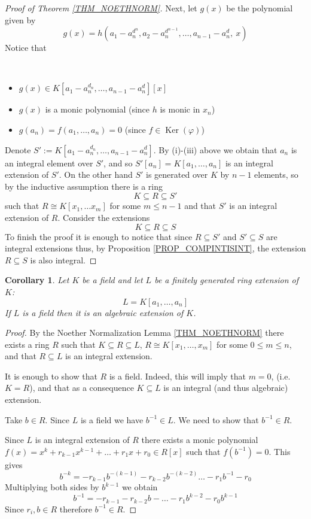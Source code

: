 \documentclass[12pt, letterpaper, oneside]{article}
\theoremstyle{plain}
\newtheorem{corollary}[theorem]{Corollary}
\theoremstyle{definition}
\newcommand{\Ker}{\operatorname{Ker}}
\newcommand{\bit}{\begin{itemize}}
\newcommand{\eit}{\end{itemize}}
\newcommand{\vs}{\vskip 5mm}
\newcommand{\isep}[1][0]{\setlength{\itemsep}{#1 mm}}
\begin{document}
\begin{proof}[Proof of Theorem \ref{THM_NOETHNORM}]
\vs\vs

Next, let   $g(x)$ be the polynomial given by 
$$g(x) = h(a_{1}-a_{n}^{d^{n}}, a_{2}-a_{n}^{d^{n-1}}, \dots,  a_{n-1}-a_{n}^{d}, \ x)$$
Notice that 


\vskip -13mm

\ 
\bit
\isep[0]
\item[(i)] $g(x)\in K[a_{1}-a_{n}^{d_{n}}, \dots,  a_{n-1}-a_{n}^{d}][x]$
\item[(ii)] $g(x)$ is a monic polynomial (since $h$ is monic in $x_{n}$) 
\item[(iii)] $g(a_{n})= f(a_{1}, \dots, a_{n}) = 0$ (since $f\in \Ker(\varphi)$)
\eit

Denote $S' := K[a_{1}-a_{n}^{d_{n}}, \dots,  a_{n-1}-a_{n}^{d}]$. 
By (i)-(iii) above we obtain that $a_{n}$ is an integral element over $S'$,
and so $S'[a_{n}] = K[a_{1}, \dots, a_{n}]$ is an integral extension of 
$S'$.  On the other hand $S'$ is generated over $K$ by $n-1$ elements, 
so by the inductive assumption there is a ring 
$$K\subseteq R \subseteq S'$$
such that $R\cong K[x_{1}, \dots x_{m}]$ for some $m\leq n-1$ and that 
$S'$ is an integral extension of $R$.  Consider the extensions 
$$K\subseteq R \subseteq S$$
To finish the proof it is enough to notice that since $R\subseteq S'$ and $S'\subseteq S$
are integral extensions thus,  by Proposition \ref{PROP_COMPINTISINT}, the extension 
$R\subseteq S$ is also integral. 
\end{proof}

\vs\vs

\begin{corollary}
\label{COR_ALGNULLSTELL}
Let $K$ be a field and let $L$ be a finitely generated ring extension of $K$:
$$L = K[a_{1}, \dots, a_{n}]$$
If $L$ is a field then it is an algebraic extension of $K$.  
\end{corollary}

\vs

\begin{proof}
By the Noether Normalization Lemma \ref{THM_NOETHNORM}
there exists a ring $R$ such that $K\subseteq R \subseteq L$, 
$R\cong K[x_{1}, \dots, x_{m}]$ for some $0\leq m\leq n$, and that 
$R\subseteq L$ is an integral extension. 

It is enough to show that $R$ is a field. Indeed, this will imply that 
$m=0$, (i.e. $K=R$),  and that as a consequence  $K\subseteq L$ 
is an integral (and thus algebraic) extension. 


Take $b\in R$. Since $L$ is a field we have $b^{-1}\in L$. We need to show that 
$b^{-1}\in R$.

Since $L$ is an integral extension of $R$ there exists a monic polynomial 
$f(x) = x^{k} + r_{k-1}x^{k-1} + {\dots} + r_{1}x +r_{0}\in R[x]$ such that 
$f(b^{-1})=0$. This gives 
$$b^{-k}  =  - r_{k-1}b^{-(k-1)} - r_{k-2}b^{-(k-2)}{\dots} - r_{1}b^{-1} - r_{0}$$
Multiplying both sides by $b^{k-1}$ we obtain 
$$b^{-1} = -r_{k-1} - r_{k-2}b  - {\dots} - r_{1}b^{k-2} -r_{0}b^{k-1}$$
Since $r_{i}, b\in R$ therefore  $b^{-1}\in R$. 
\end{proof}
\end{document}
